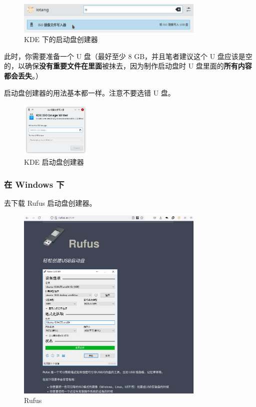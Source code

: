 \documentclass[UTF-8]{ctexart}
\begin{document}
				\begin{figure}[H]
					\centering
					\includegraphics[width=0.8\textwidth]{fig/iso_burn.png}
					\caption*{KDE 下的启动盘创建器}
				\end{figure}
				
				此时，你需要准备一个 U 盘（最好至少 8 GB，并且笔者建议这个 U 盘应该是空的，以确保\textbf{\large 没有重要文件在里面}被抹去，因为制作启动盘时 U 盘里面的\textbf{\large 所有内容都会丢失}。）
				
				启动盘创建器的用法基本都一样。注意不要选错 U 盘。
			
				\begin{figure}[H]
					\centering
					\includegraphics[width=0.3\textwidth]{fig/isoimagewriter.png}
					\caption*{KDE 启动盘创建器}
				\end{figure}


			\subsubsection{在 Windows 下}
			
				去下载 Rufus 启动盘创建器。
				
				\begin{figure}[H]
					\centering
					\includegraphics[width=0.8\textwidth]{fig/rufus.png}
					\caption*{Rufus}
				\end{figure}
			
\end{document}
